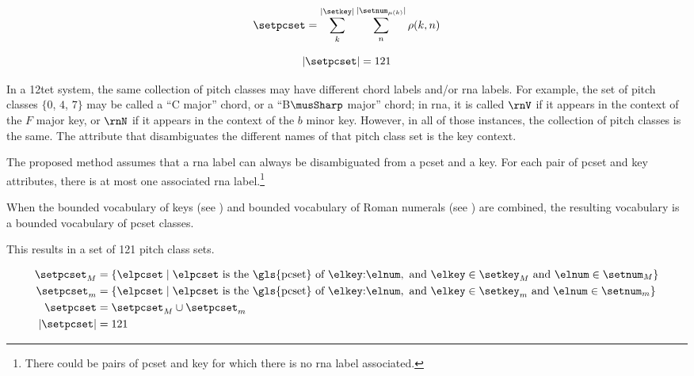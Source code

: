 
\begin{equation}
    \setpcset = \sum_{k}^{| \setkey |} \sum_{n}^{| \setnum_{\mu(k)} |} \rho(k, n)
\end{equation}

\begin{equation}
    | \setpcset | = 121
\end{equation}

In a \gls{12tet} system, the same collection of pitch
classes may have different chord labels and/or \gls{rna}
labels. For example, the set of pitch classes $\{0$, $4$,
$7\}$ may be called a ``C major'' chord, or a ``B$\musSharp$
major'' chord; in \gls{rna}, it is called $\rnV$ if it
appears in the context of the $F$ major key, or $\rnN$ if it
appears in the context of the $b$ minor key. However, in all
of those instances, the collection of pitch classes is the
same. The attribute that disambiguates the different names
of that pitch class set is the key context.

The proposed method assumes that a \gls{rna} label can
always be disambiguated from a \gls{pcset} and a key. For
each pair of \gls{pcset} and key attributes, there is at
most one associated \gls{rna} label.\footnote{There could be
pairs of \gls{pcset} and key for which there is no \gls{rna}
label associated.}

When the bounded vocabulary of keys (see
) and bounded vocabulary
of Roman numerals (see
) are combined, the
resulting vocabulary is a bounded vocabulary of \gls{pcset}
classes.

This results in a set of 121 pitch class sets.

\begin{equation}
    \begin{split}
    \setpcset_M &= \{ \elpcset \mid \elpcset \text{ is the \gls{pcset} of }
    \elkey\text{:}\elnum, \text{ and }
    \elkey \in \setkey_M \text{ and } \elnum \in \setnum_M  \} \\
    \setpcset_m &= \{ \elpcset \mid \elpcset \text{ is the \gls{pcset} of }
    \elkey\text{:}\elnum, \text{ and }
    \elkey \in \setkey_m \text{ and } \elnum \in \setnum_m  \} \\
    \setpcset &= \setpcset_M \cup \setpcset_m \\
    | \setpcset | &= 121 \\    
    \end{split}
\end{equation}
